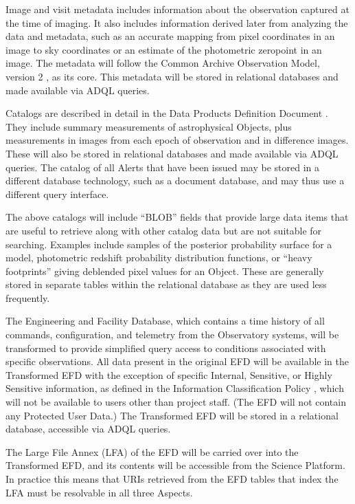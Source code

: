 Image and visit metadata includes information about the observation captured at
the time of imaging.
It also includes information derived later from analyzing the data
and metadata, such as an accurate mapping from pixel coordinates in an image to
sky coordinates or an estimate of the photometric zeropoint in an image.
The metadata will follow the Common Archive Observation
Model, version 2 \citep{2012ASPC..461..339D,CAOM2}, as its core.
This metadata will be stored in relational databases and made available
via ADQL queries.

Catalogs are described in detail in the Data Products Definition Document
.  They include summary measurements of astrophysical Objects,
plus measurements in images from each epoch of observation and in difference
images.  These will also be stored in relational databases and made available
via ADQL queries.  The catalog of all Alerts that have been issued may be
stored in a different database technology, such as a document database, and
may thus use a different query interface.

The above catalogs will include ``BLOB'' fields that provide large data items
that are useful to retrieve along with other catalog data but are not
suitable for searching.  Examples include samples of the posterior probability
surface for a model, photometric redshift probability distribution functions,
or ``heavy footprints'' giving deblended pixel values for an Object.  These
are generally stored in separate tables within the relational database as
they are used less frequently.

The Engineering and Facility Database, which contains a time history of all
commands, configuration, and telemetry from the Observatory systems, will
be transformed to provide simplified query access to conditions associated
with specific observations.
All data present in the original EFD will be available in the Transformed EFD
with the exception of specific Internal, Sensitive, or Highly Sensitive
information, as defined in the Information Classification Policy
,
which will not be available to users other than project staff.
(The EFD will not contain any Protected User Data.)
The Transformed EFD will be stored in a relational database,
accessible via ADQL queries.

The Large File Annex (LFA) of the EFD will be carried over into the Transformed
EFD, and its contents will be accessible from the Science Platform.
In practice this means that URIs retrieved from the EFD tables that index the
LFA must be resolvable in all three Aspects.

